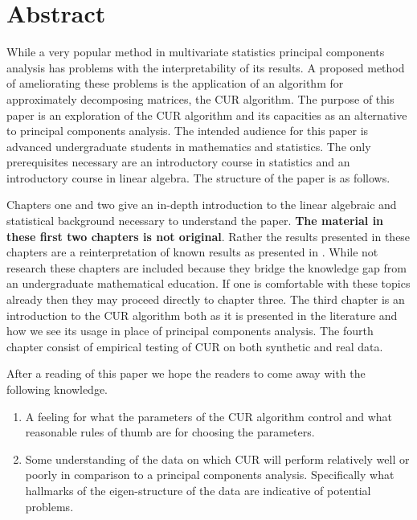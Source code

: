 \documentclass{book}
\begin{document}

\tableofcontents


\chapter*{Abstract}

While a very popular method in multivariate statistics principal components analysis has problems with the interpretability of its results. A proposed method of ameliorating these problems is the application of an algorithm for approximately decomposing matrices, the CUR algorithm. The purpose of this paper is an exploration of the CUR algorithm and its capacities as an alternative to principal components analysis. The intended audience for this paper is advanced undergraduate students in mathematics and statistics. The only prerequisites necessary are an introductory course in statistics and an introductory course in linear algebra. The structure of the paper is as follows. 

Chapters one and two give an in-depth introduction to the linear algebraic and statistical background necessary to understand the paper. {\bf The material in these first two chapters is not original}. Rather the results presented in these chapters are a reinterpretation of known results as presented in \cite{lay,rencher,johnson}. While not research these chapters are included because they bridge the knowledge gap from an undergraduate mathematical education. If one is comfortable with these topics already then they may proceed directly to chapter three. The third chapter is an introduction to the CUR algorithm both as it is presented in the literature and how we see its usage in place of principal components analysis. The fourth chapter consist of empirical testing of CUR on both synthetic and real data. 

After a reading of this paper we hope the readers to come away with the following knowledge.
\begin{enumerate}
\item A feeling for what the parameters of the CUR algorithm control and what reasonable rules of thumb are for choosing the parameters. 

\item Some understanding of the data on which CUR will perform relatively well or poorly in comparison to a principal components analysis. Specifically what hallmarks of the eigen-structure of the data are indicative of potential problems. 
\end{enumerate}
\end{document}
